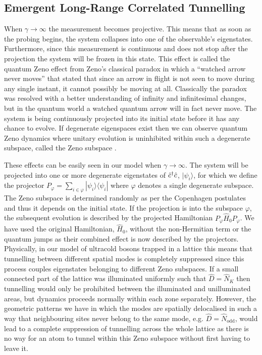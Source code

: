 \subsection{Emergent Long-Range Correlated Tunnelling}

When $\gamma \rightarrow \infty$ the measurement becomes
projective. This means that as soon as the probing begins, the system
collapses into one of the observable's eigenstates. Furthermore, since
this measurement is continuous and does not stop after the projection
the system will be frozen in this state. This effect is called the
quantum Zeno effect \cite{misra1977, facchi2008} from Zeno's classical
paradox in which a ``watched arrow never moves'' that stated that
since an arrow in flight is not seen to move during any single
instant, it cannot possibly be moving at all. Classically the paradox
was resolved with a better understanding of infinity and infinitesimal
changes, but in the quantum world a watched quantum arrow will in fact
never move. The system is being continuously projected into its
initial state before it has any chance to evolve. If degenerate
eigenspaces exist then we can observe quantum Zeno dynamics where
unitary evolution is uninhibited within such a degenerate subspace,
called the Zeno subspace \cite{facchi2008, raimond2010, raimond2012,
  signoles2014}.

These effects can be easily seen in our model when $\gamma \rightarrow
\infty$. The system will be projected into one or more degenerate
eigenstates of $\hat{c}^\dagger \hat{c}$, $| \psi_i \rangle$, for which we define the
projector $P_\varphi = \sum_{i \in \varphi} | \psi_i \rangle \langle
\psi_i |$ where $\varphi$ denotes a single degenerate subspace. The
Zeno subspace is determined randomly as per the Copenhagen postulates
and thus it depends on the initial state. If the projection is into
the subspace $\varphi$, the subsequent evolution is described by the
projected Hamiltonian $P_{\varphi} \hat{H}_0 P_{\varphi}$. We have
used the original Hamiltonian, $\hat{H}_0$, without the non-Hermitian
term or the quantum jumps as their combined effect is now described by
the projectors. Physically, in our model of ultracold bosons trapped
in a lattice this means that tunnelling between different spatial
modes is completely suppressed since this process couples eigenstates
belonging to different Zeno subspaces. If a small connected part of
the lattice was illuminated uniformly such that $\hat{D} = \hat{N}_K$
then tunnelling would only be prohibited between the illuminated and
unilluminated areas, but dynamics proceeds normally within each zone
separately. However, the geometric patterns we have in which the modes
are spatially delocalised in such a way that neighbouring sites never
belong to the same mode, e.g.  $\hat{D} = \hat{N}_\mathrm{odd}$, would
lead to a complete suppression of tunnelling across the whole lattice
as there is no way for an atom to tunnel within this Zeno subspace
without first having to leave it.

